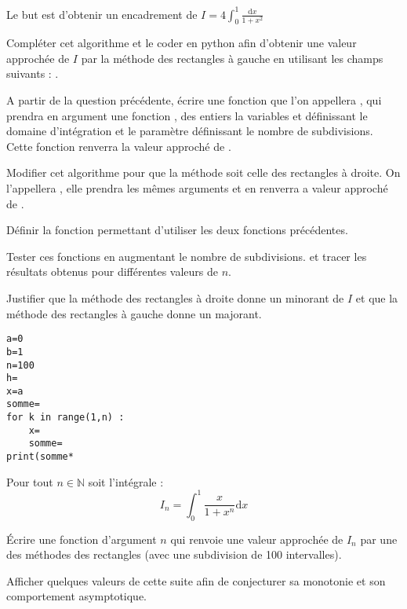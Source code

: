 Le but est d'obtenir un encadrement de
\quad $\displaystyle I=4\int_0^1\frac{\text{d}x}{1+x^2}$

\begin{minipage}[c]{.5\linewidth}
\question{}
Compléter cet algorithme et le coder en python afin d'obtenir une valeur approchée de $I$ par la méthode des rectangles à gauche en utilisant les champs suivants : 
.

\question{} A partir de la question précédente, écrire une fonction que l'on appellera , qui prendra en argument une fonction , des entiers la variables  et  définissant le domaine d'intégration et le paramètre  définissant le nombre de subdivisions. Cette fonction renverra la valeur approché de .

\question{}
Modifier cet algorithme pour que la méthode soit celle des rectangles à droite. On l'appellera , elle prendra les mêmes arguments et en renverra a valeur approché de .

\question{} Définir la fonction  permettant d'utiliser les deux fonctions précédentes. 



\question{}
Tester ces fonctions en augmentant le nombre de subdivisions. et tracer les résultats obtenus pour différentes valeurs de $n$.

\question{}
Justifier que la méthode des rectangles à droite donne un minorant de $I$ et que la méthode des rectangles à gauche donne un majorant. 


\end{minipage} \hfill
\begin{minipage}[r]{.35\linewidth}
\begin{lstlisting}
a=0
b=1
n=100
h=
x=a
somme=
for k in range(1,n) :
    x=
    somme=
print(somme*
\end{lstlisting}
\end{minipage}

Pour tout $n\in\mathbb{N}$ soit l'intégrale : 
$$I_n=\int_0^1\frac{x}{1+x^n} \text{d}x$$

\question{} Écrire une fonction d'argument $n$ qui renvoie une valeur approchée de $I_n$ par une des méthodes des rectangles (avec une subdivision de 100 intervalles).

\question{} Afficher quelques  valeurs de cette suite afin de conjecturer sa monotonie et son comportement asymptotique.